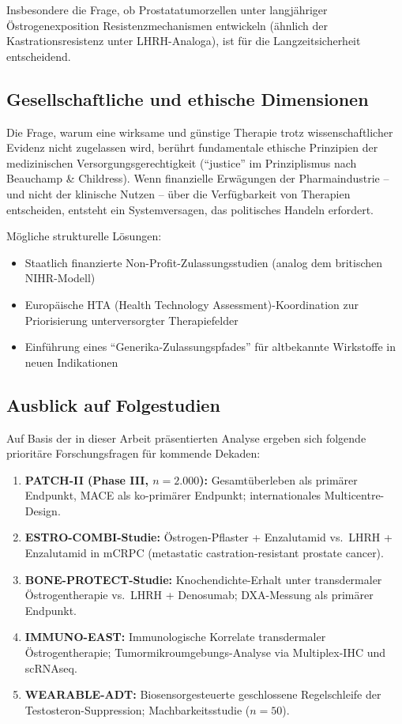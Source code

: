 ﻿\documentclass[a4paper,12pt]{article}
\theoremstyle{definition}
\begin{document}
Insbesondere die Frage, ob Prostatatumorzellen unter langjähriger Östrogenexposition Resistenzmechanismen entwickeln (ähnlich der Kastrationsresistenz unter LHRH-Analoga), ist für die Langzeitsicherheit entscheidend.

\subsection{Gesellschaftliche und ethische Dimensionen}

Die Frage, warum eine wirksame und günstige Therapie trotz wissenschaftlicher Evidenz nicht zugelassen wird, berührt fundamentale ethische Prinzipien der medizinischen Versorgungsgerechtigkeit (``justice'' im Prinziplismus nach Beauchamp \& Childress).
Wenn finanzielle Erwägungen der Pharmaindustrie -- und nicht der klinische Nutzen -- über die Verfügbarkeit von Therapien entscheiden, entsteht ein Systemversagen, das politisches Handeln erfordert.

Mögliche strukturelle Lösungen:
\begin{itemize}
  \item Staatlich finanzierte Non-Profit-Zulassungsstudien (analog dem britischen NIHR-Modell)
  \item Europäische HTA (Health Technology Assessment)-Koordination zur Priorisierung unterversorgter Therapiefelder
  \item Einführung eines ``Generika-Zulassungspfades'' für altbekannte Wirkstoffe in neuen Indikationen
\end{itemize}

\subsection{Ausblick auf Folgestudien}

Auf Basis der in dieser Arbeit präsentierten Analyse ergeben sich folgende prioritäre Forschungsfragen für kommende Dekaden:

\begin{enumerate}
  \item \textbf{PATCH-II (Phase III, $n = 2.000$):} Gesamtüberleben als primärer Endpunkt, MACE als ko-primärer Endpunkt; internationales Multicentre-Design.
  \item \textbf{ESTRO-COMBI-Studie:} Östrogen-Pflaster + Enzalutamid vs.\ LHRH + Enzalutamid in mCRPC (metastatic castration-resistant prostate cancer).
  \item \textbf{BONE-PROTECT-Studie:} Knochendichte-Erhalt unter transdermaler Östrogen\-therapie vs.\ LHRH + Denosumab; DXA-Messung als primärer Endpunkt.
  \item \textbf{IMMUNO-EAST:} Immunologische Korrelate transdermaler Östrogentherapie; Tumormikroumgebungs-Analyse via Multiplex-IHC und scRNAseq.
  \item \textbf{WEARABLE-ADT:} Biosensorgesteuerte geschlossene Regelschleife der Testosteron-Suppression; Machbarkeitsstudie ($n = 50$).
\end{enumerate}
\end{document}

